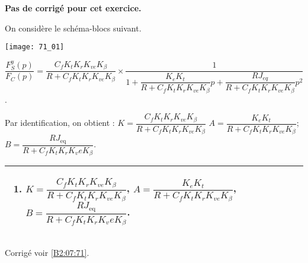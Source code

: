 \normalfalse \difficiletrue \tdifficilefalse
\correctiontrue


\setcounter{numques}{0}
\ifcorrection
\else
\textbf{Pas de corrigé pour cet exercice.}
\fi

\ifprof
\else

On considère le schéma-blocs suivant.
\begin{center}
\texttt{[image: 71\_01]}
\end{center}
\fi
{}
\ifprof
\begin{corrige}

$\dfrac{F_S^y (p)}{F_C (p)}=\dfrac{C_f K_t K_r K_{ve} K_{\beta}}{R+C_f K_t K_r K_{ve} K_{\beta} } \times \dfrac{1}{1+\dfrac{K_e K_t}{R+C_f K_t K_r K_{ve} K_{\beta} }p+\dfrac{RJ_{eq}}{R+C_f K_t K_r K_{ve} K_{\beta} } p^2}$.


Par identification, on obtient :
$K=\dfrac{C_f K_t K_r K_{ve} K_{\beta}}{R+C_f K_t K_r K_{ve} K_{\beta}}$
$A=\dfrac{K_e K_t}{R+C_f K_t K_r K_{ve} K_{\beta} }$;
$B=\dfrac{RJ_{\text{eq}}}{R+C_f K_t K_r K_ve K_{\beta} }$.

\end{corrige}
\else
\fi

 
 \ifprof
\else
\ifcolle
\else
\footnotesize
\noindent
\begin{tabular}{|p{.95\linewidth}|}
\hline
\begin{enumerate}
\item $K=\dfrac{C_f K_t K_r K_{ve} K_{\beta}}{R+C_f K_t K_r K_{ve} K_{\beta}}$,
$A=\dfrac{K_e K_t}{R+C_f K_t K_r K_{ve} K_{\beta} }$,
$B=\dfrac{RJ_{\text{eq}}}{R+C_f K_t K_r K_ve K_{\beta} }$.
\end{enumerate} \\ \hline
\end{tabular}
\normalsize
\fi

\fi


\ifprof
\else
\begin{flushright}
\footnotesize{Corrigé  voir \ref{B2:07:71}.}
\end{flushright}%
\fi
